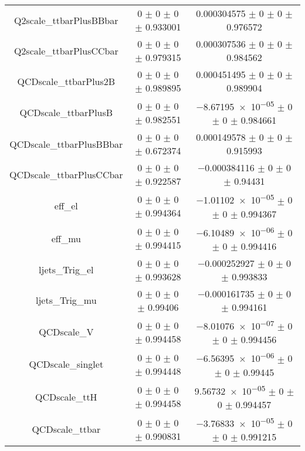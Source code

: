 \begin{table}
\begin{tabular}{ccc}
Q2scale\_ttbarPlusBBbar & \num{0} $\pm$ \num{0} $\pm$ \num{0} $\pm$ \num{0.933001} & \num{0.000304575} $\pm$ \num{0} $\pm$ \num{0} $\pm$ \num{0.976572}\\
Q2scale\_ttbarPlusCCbar & \num{0} $\pm$ \num{0} $\pm$ \num{0} $\pm$ \num{0.979315} & \num{0.000307536} $\pm$ \num{0} $\pm$ \num{0} $\pm$ \num{0.984562}\\
QCDscale\_ttbarPlus2B & \num{0} $\pm$ \num{0} $\pm$ \num{0} $\pm$ \num{0.989895} & \num{0.000451495} $\pm$ \num{0} $\pm$ \num{0} $\pm$ \num{0.989904}\\
QCDscale\_ttbarPlusB & \num{0} $\pm$ \num{0} $\pm$ \num{0} $\pm$ \num{0.982551} & \num{-8.67195e-05} $\pm$ \num{0} $\pm$ \num{0} $\pm$ \num{0.984661}\\
QCDscale\_ttbarPlusBBbar & \num{0} $\pm$ \num{0} $\pm$ \num{0} $\pm$ \num{0.672374} & \num{0.000149578} $\pm$ \num{0} $\pm$ \num{0} $\pm$ \num{0.915993}\\
QCDscale\_ttbarPlusCCbar & \num{0} $\pm$ \num{0} $\pm$ \num{0} $\pm$ \num{0.922587} & \num{-0.000384116} $\pm$ \num{0} $\pm$ \num{0} $\pm$ \num{0.94431}\\
eff\_el & \num{0} $\pm$ \num{0} $\pm$ \num{0} $\pm$ \num{0.994364} & \num{-1.01102e-05} $\pm$ \num{0} $\pm$ \num{0} $\pm$ \num{0.994367}\\
eff\_mu & \num{0} $\pm$ \num{0} $\pm$ \num{0} $\pm$ \num{0.994415} & \num{-6.10489e-06} $\pm$ \num{0} $\pm$ \num{0} $\pm$ \num{0.994416}\\
ljets\_Trig\_el & \num{0} $\pm$ \num{0} $\pm$ \num{0} $\pm$ \num{0.993628} & \num{-0.000252927} $\pm$ \num{0} $\pm$ \num{0} $\pm$ \num{0.993833}\\
ljets\_Trig\_mu & \num{0} $\pm$ \num{0} $\pm$ \num{0} $\pm$ \num{0.99406} & \num{-0.000161735} $\pm$ \num{0} $\pm$ \num{0} $\pm$ \num{0.994161}\\
QCDscale\_V & \num{0} $\pm$ \num{0} $\pm$ \num{0} $\pm$ \num{0.994458} & \num{-8.01076e-07} $\pm$ \num{0} $\pm$ \num{0} $\pm$ \num{0.994456}\\
QCDscale\_singlet & \num{0} $\pm$ \num{0} $\pm$ \num{0} $\pm$ \num{0.994448} & \num{-6.56395e-06} $\pm$ \num{0} $\pm$ \num{0} $\pm$ \num{0.99445}\\
QCDscale\_ttH & \num{0} $\pm$ \num{0} $\pm$ \num{0} $\pm$ \num{0.994458} & \num{9.56732e-05} $\pm$ \num{0} $\pm$ \num{0} $\pm$ \num{0.994457}\\
QCDscale\_ttbar & \num{0} $\pm$ \num{0} $\pm$ \num{0} $\pm$ \num{0.990831} & \num{-3.76833e-05} $\pm$ \num{0} $\pm$ \num{0} $\pm$ \num{0.991215}\\

\end{tabular}
\end{table}
